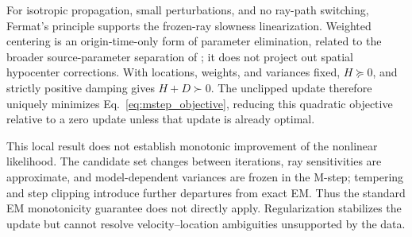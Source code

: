 \documentclass[12pt, a4paper]{article}
\begin{document}
For isotropic propagation, small perturbations, and no ray-path switching, Fermat's principle supports the frozen-ray slowness linearization. Weighted centering is an origin-time-only form of parameter elimination, related to the broader source-parameter separation of \textcite{pavlis1980}; it does not project out spatial hypocenter corrections. With locations, weights, and variances fixed, $H\succeq0$, and strictly positive damping gives $H+D\succ0$. The unclipped update therefore uniquely minimizes Eq.~\eqref{eq:mstep_objective}, reducing this quadratic objective relative to a zero update unless that update is already optimal.

This local result does not establish monotonic improvement of the nonlinear likelihood. The candidate set changes between iterations, ray sensitivities are approximate, and model-dependent variances are frozen in the M-step; tempering and step clipping introduce further departures from exact EM. Thus the standard EM monotonicity guarantee \parencite{dempster1977} does not directly apply. Regularization stabilizes the update but cannot resolve velocity--location ambiguities unsupported by the data.



\printbibliography
\end{document}
